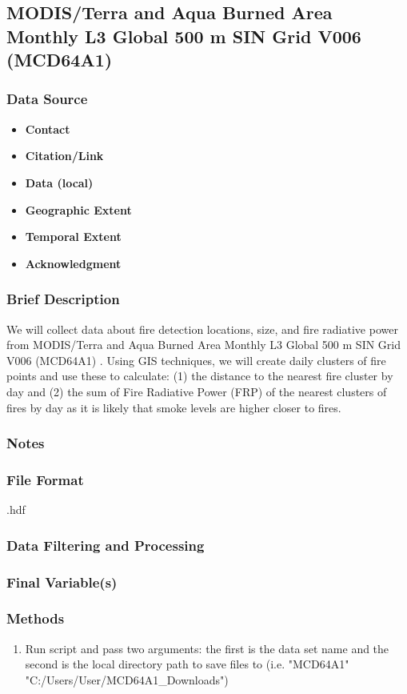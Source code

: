 \subsection{MODIS/Terra and Aqua Burned Area Monthly L3 Global 500 m SIN Grid V006 (MCD64A1) }
\subsubsection*{Data Source}
\begin{itemize}[nolistsep]
\item \textbf{Contact}
\item \textbf{Citation/Link}
\item \textbf{Data (local)}
\item \textbf{Geographic Extent}
\item \textbf{Temporal Extent}
\item \textbf{Acknowledgment}
\end{itemize}
\subsubsection*{Brief Description}

We will collect data about fire detection locations, size, and fire radiative power from MODIS/Terra and Aqua Burned Area Monthly L3 Global 500 m SIN Grid V006 (MCD64A1) 
\citep{Schroeder2014}. %
Using GIS techniques, we will create daily clusters of fire points and use these to calculate: (1) the distance to the nearest fire cluster by day and (2) the sum of Fire Radiative Power (FRP) of the nearest clusters of fires by day as it is likely that smoke levels are higher closer to fires.

\subsubsection*{Notes}
\subsubsection*{File Format} .hdf
\subsubsection*{Data Filtering and Processing}
\subsubsection*{Final Variable(s)}
\subsubsection*{Methods}
\begin{enumerate}
\item Run script and pass two arguments: the first is the data set name and the second is the local directory path to save files to (i.e. "MCD64A1" "C:/Users/User/MCD64A1\_Downloads")
\end{enumerate}
